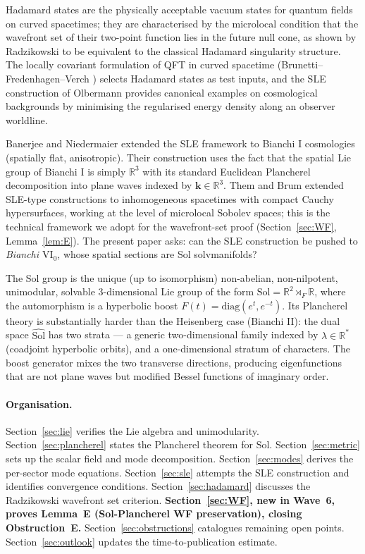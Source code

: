 \documentclass[11pt,a4paper]{article}
\theoremstyle{definition}
\newcommand{\Sol}{\mathrm{Sol}}
\newcommand{\R}{\mathbb{R}}
\begin{document}
Hadamard states are the physically acceptable vacuum states for quantum fields on
curved spacetimes; they are characterised by the microlocal condition that the
wavefront set of their two-point function lies in the future null cone, as shown
by Radzikowski \cite{Rad96} to be equivalent to the classical Hadamard singularity
structure.  The locally covariant formulation of QFT in curved spacetime
(Brunetti--Fredenhagen--Verch \cite{BFV03}) selects Hadamard states as
test inputs, and the SLE construction of Olbermann \cite{Olb07} provides
canonical examples on cosmological backgrounds by minimising the regularised
energy density along an observer worldline.

Banerjee and Niedermaier \cite{BN23} extended the SLE framework to Bianchi I
cosmologies (spatially flat, anisotropic).  Their construction uses the fact
that the spatial Lie group of Bianchi I is simply $\R^3$ with its standard
Euclidean Plancherel decomposition into plane waves indexed by
$\boldsymbol{k}\in\R^3$.  Them and Brum \cite{TB13} extended SLE-type constructions
to inhomogeneous spacetimes with compact Cauchy hypersurfaces, working at the
level of microlocal Sobolev spaces; this is the technical framework we adopt
for the wavefront-set proof (Section~\ref{sec:WF}, Lemma~\ref{lem:E}).
The present paper asks: can the SLE construction be pushed to
\emph{Bianchi $\mathrm{VI_0}$}, whose spatial sections are Sol solvmanifolds?

The Sol group is the unique (up to isomorphism) non-abelian, non-nilpotent,
unimodular, solvable $3$-dimensional Lie group of the form
$\Sol = \R^2 \rtimes_F \R$, where the automorphism is a hyperbolic boost
$F(t) = \mathrm{diag}(e^t, e^{-t})$.  Its Plancherel theory is substantially
harder than the Heisenberg case (Bianchi II): the dual space $\widehat{\Sol}$
has two strata --- a generic two-dimensional family indexed by
$\lambda \in \R^*$ (coadjoint hyperbolic orbits), and a one-dimensional stratum
of characters.  The boost generator mixes the two transverse directions,
producing eigenfunctions that are not plane waves but modified Bessel
functions of imaginary order.

\paragraph{Organisation.}
Section~\ref{sec:lie} verifies the Lie algebra and unimodularity.
Section~\ref{sec:plancherel} states the Plancherel theorem for $\Sol$.
Section~\ref{sec:metric} sets up the scalar field and mode decomposition.
Section~\ref{sec:modes} derives the per-sector mode equations.
Section~\ref{sec:sle} attempts the SLE construction and identifies convergence conditions.
Section~\ref{sec:hadamard} discusses the Radzikowski wavefront set criterion.
\textbf{Section~\ref{sec:WF}, new in Wave~6, proves Lemma~E
(Sol-Plancherel WF preservation), closing Obstruction~E.}
Section~\ref{sec:obstructions} catalogues remaining open points.
Section~\ref{sec:outlook} updates the time-to-publication estimate.
\end{document}
